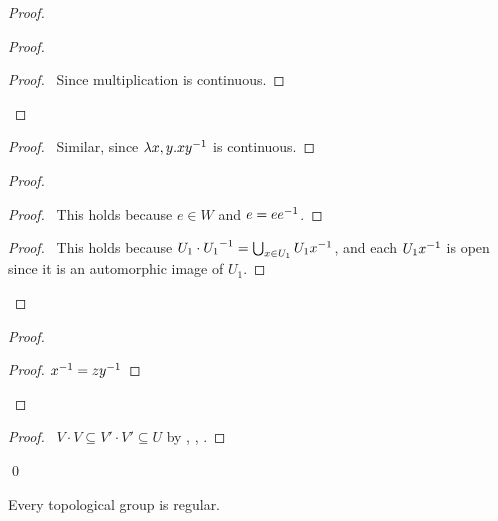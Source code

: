 \begin{proof}
  \pf
  \begin{proof}
    \begin{proof}
      \pf\ Since multiplication is continuous.
    \end{proof}
  \end{proof}
  \begin{proof}
    \pf\ Similar, since $\lambda x,y.x {y}^{-1}$ is continuous.
  \end{proof}
  \begin{proof}
    \begin{proof}
      \pf\ This holds because $e \in W$ and $e = e {e}^{-1}$.
    \end{proof}
    \begin{proof}
      \pf\ This holds because $U_1 \cdot {U_1}^{-1} = \bigcup_{x \in U_1} U_1 {x}^{-1}$, and each $U_1 {x}^{-1}$ is open since it is an automorphic image of $U_1$.
    \end{proof}
  \end{proof}
  \begin{proof}
    \begin{proof}
      \pf ${x}^{-1} = z {y}^{-1}$
    \end{proof}
  \end{proof}
  \begin{proof}
    \pf\ $V \cdot V \subseteq V' \cdot V' \subseteq U$ by , , .
  \end{proof}
  \qed
\end{proof}

\begin{prop}
  \label{prop:group:regular}
  Every topological group is regular.
\end{prop}

